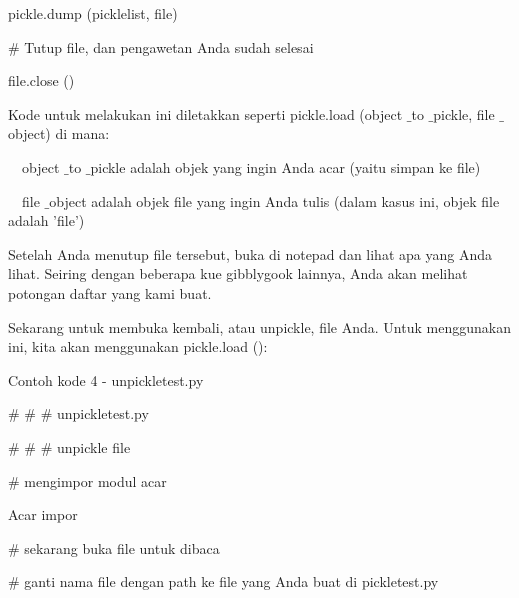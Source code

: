 \documentclass[a4paper,12pt]{report}
\begin{document}
\noindent 
pickle.dump (picklelist, file) \par
\noindent 
\vspace{12pt}
\noindent 
 $  \#  $ Tutup file, dan pengawetan Anda sudah selesai \par
\noindent 
file.close () \par
\vspace{14pt}
\noindent 
Kode untuk melakukan ini diletakkan seperti pickle.load (object $  \_  $to $  \_  $pickle, file $  \_  $object) di mana: \par
\noindent 
\vspace{12pt}
\noindent 
 $  $ $  $ $  $ $  $object $  \_  $to $  \_  $pickle adalah objek yang ingin Anda acar (yaitu simpan ke file) \par
\noindent 
 $  $ $  $ $  $ $  $file $  \_  $object adalah objek file yang ingin Anda tulis (dalam kasus ini, objek file adalah 'file') \par
\noindent 
\vspace{12pt}
\noindent 
Setelah Anda menutup file tersebut, buka di notepad dan lihat apa yang Anda lihat. Seiring dengan beberapa kue gibblygook lainnya, Anda akan melihat potongan daftar yang kami buat. \par
\noindent 
\vspace{12pt}
\noindent 
Sekarang untuk membuka kembali, atau unpickle, file Anda. Untuk menggunakan ini, kita akan menggunakan pickle.load (): \par
\noindent 
Contoh kode 4 - unpickletest.py \par
\noindent 
\vspace{10pt}
\noindent 
{\fontsize{10pt}{10pt}\selectfont  $  \#  $ $  \#  $ $  \#  $ unpickletest.py} \par
\noindent 
{\fontsize{10pt}{10pt}\selectfont  $  \#  $ $  \#  $ $  \#  $ unpickle file} \par
\noindent 
\vspace{10pt}
\noindent 
{\fontsize{10pt}{10pt}\selectfont  $  \#  $ mengimpor modul acar} \par
\noindent 
{\fontsize{10pt}{10pt}\selectfont Acar impor} \par
\noindent 
\vspace{10pt}
\noindent 
{\fontsize{10pt}{10pt}\selectfont  $  \#  $ sekarang buka file untuk dibaca} \par
\noindent 
{\fontsize{10pt}{10pt}\selectfont  $  \#  $ ganti nama file dengan path ke file yang Anda buat di pickletest.py} \par
\noindent 
\end{document}
